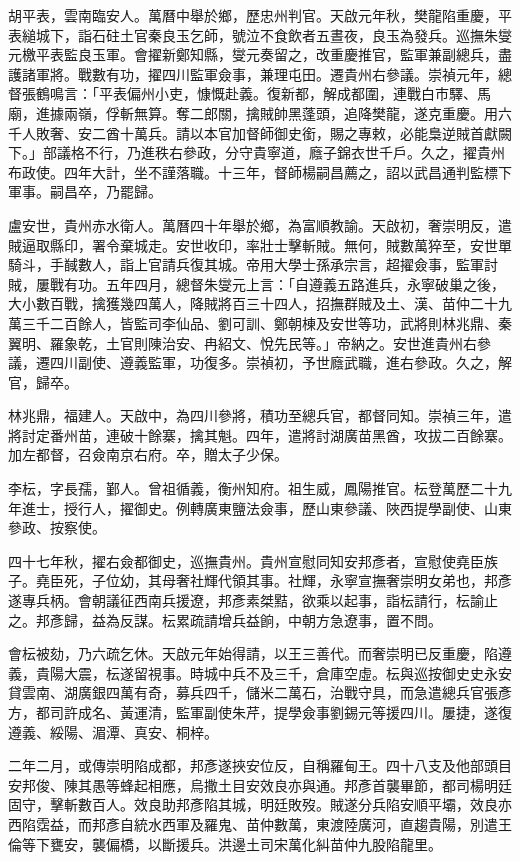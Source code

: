 \begin{pinyinscope}
{{胡平表，雲南臨安人。萬曆中舉於鄉，歷忠州判官。天啟元年秋，樊龍陷重慶，平表縋城下，詣石砫土官秦良玉乞師，號泣不食飲者五晝夜，良玉為發兵。巡撫朱燮元檄平表監良玉軍。會擢新鄭知縣，燮元奏留之，改重慶推官，監軍兼副總兵，盡護諸軍將。戰數有功，擢四川監軍僉事，兼理屯田。遷貴州右參議。崇禎元年，總督張鶴鳴言：「平表偏州小吏，慷慨赴義。復新都，解成都圍，連戰白市驛、馬廟，進據兩嶺，俘斬無算。奪二郎關，擒賊帥黑蓬頭，追降樊龍，遂克重慶。用六千人敗奢、安二酋十萬兵。請以本官加督師御史銜，賜之專敕，必能梟逆賊首獻闕下。」部議格不行，乃進秩右參政，分守貴寧道，廕子錦衣世千戶。久之，擢貴州布政使。四年大計，坐不謹落職。十三年，督師楊嗣昌薦之，詔以武昌通判監標下軍事。嗣昌卒，乃罷歸。

盧安世，貴州赤水衛人。萬曆四十年舉於鄉，為富順教諭。天啟初，奢崇明反，遣賊逼取縣印，署令棄城走。安世收印，率壯士擊斬賊。無何，賊數萬猝至，安世單騎斗，手馘數人，詣上官請兵復其城。帝用大學士孫承宗言，超擢僉事，監軍討賊，屢戰有功。五年四月，總督朱燮元上言：「自遵義五路進兵，永寧破巢之後，大小數百戰，擒獲幾四萬人，降賊將百三十四人，招撫群賊及土、漢、苗仲二十九萬三千二百餘人，皆監司李仙品、劉可訓、鄭朝棟及安世等功，武將則林兆鼎、秦翼明、羅象乾，土官則陳治安、冉紹文、悅先民等。」帝納之。安世進貴州右參議，遷四川副使、遵義監軍，功復多。崇禎初，予世廕武職，進右參政。久之，解官，歸卒。

林兆鼎，福建人。天啟中，為四川參將，積功至總兵官，都督同知。崇禎三年，遣將討定番州苗，連破十餘寨，擒其魁。四年，遣將討湖廣苗黑酋，攻拔二百餘寨。加左都督，召僉南京右府。卒，贈太子少保。

李枟，字長孺，鄞人。曾祖循義，衡州知府。祖生威，鳳陽推官。枟登萬歷二十九年進士，授行人，擢御史。例轉廣東鹽法僉事，歷山東參議、陜西提學副使、山東參政、按察使。

四十七年秋，擢右僉都御史，巡撫貴州。貴州宣慰同知安邦彥者，宣慰使堯臣族子。堯臣死，子位幼，其母奢社輝代領其事。社輝，永寧宣撫奢崇明女弟也，邦彥遂專兵柄。會朝議征西南兵援遼，邦彥素桀黠，欲乘以起事，詣枟請行，枟諭止之。邦彥歸，益為反謀。枟累疏請增兵益餉，中朝方急遼事，置不問。

會枟被劾，乃六疏乞休。天啟元年始得請，以王三善代。而奢崇明已反重慶，陷遵義，貴陽大震，枟遂留視事。時城中兵不及三千，倉庫空虛。枟與巡按御史史永安貸雲南、湖廣銀四萬有奇，募兵四千，儲米二萬石，治戰守具，而急遣總兵官張彥方，都司許成名、黃運清，監軍副使朱芹，提學僉事劉錫元等援四川。屢捷，遂復遵義、綏陽、湄潭、真安、桐梓。

二年二月，或傳崇明陷成都，邦彥遂挾安位反，自稱羅甸王。四十八支及他部頭目安邦俊、陳其愚等蜂起相應，烏撒土目安效良亦與通。邦彥首襲畢節，都司楊明廷固守，擊斬數百人。效良助邦彥陷其城，明廷敗歿。賊遂分兵陷安順平壩，效良亦西陷霑益，而邦彥自統水西軍及羅鬼、苗仲數萬，東渡陸廣河，直趨貴陽，別遣王倫等下甕安，襲偏橋，以斷援兵。洪邊土司宋萬化糾苗仲九股陷龍里。

}}
\end{pinyinscope}
